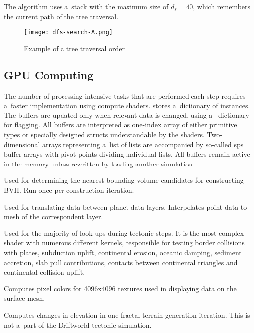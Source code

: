 The algorithm uses a~stack with the maximum size of $d_s=40$, which remembers the current path of the tree traversal.
\begin{figure}[ht]
\centering
\texttt{[image: dfs-search-A.png]}
\caption{Example of a tree traversal order}
\label{fig:dfs-traversal}
\end{figure}
\subsection{GPU Computing}
The number of processing-intensive tasks that are performed each step requires a~faster implementation using compute shaders.  stores a~dictionary of  instances. The buffers are updated only when relevant data is changed, using a~ dictionary for flagging. All buffers are interpreted as one-index array of either primitive types or specially designed structs understandable by the shaders. Two-dimensional arrays representing a~list of lists are accompanied by so-called sps buffer arrays with pivot points dividing individual lists. All buffers remain active in the memory unless rewritten by loading another simulation.
\begin{itemize}[\label={}]
\item[\textbf{BVH nearest neighbour shader}] Used for determining the nearest bounding volume candidates for constructing BVH. Run once per construction iteration.
\item[\textbf{Vertex data interpolation shader}]  Used for translating data between planet data layers. Interpolates point data to mesh of the correspondent layer.
\item[\textbf{Plate interactions shader}] Used for the majority of look-ups during tectonic steps.  It is the most complex shader with numerous different kernels, responsible for testing border collisions with plates, subduction uplift, continental erosion, oceanic damping, sediment accretion, slab pull contributions, contacts between continental triangles and continental collision uplift.
\item[\textbf{Overlay texture shader}] Computes pixel colors for 4096x4096 textures used in displaying data on the surface mesh.
\item[\textbf{Fractal terrain shader}] Computes changes in elevation in one fractal terrain generation iteration. This is not a~part of the Driftworld tectonic simulation.
\end{itemize}

